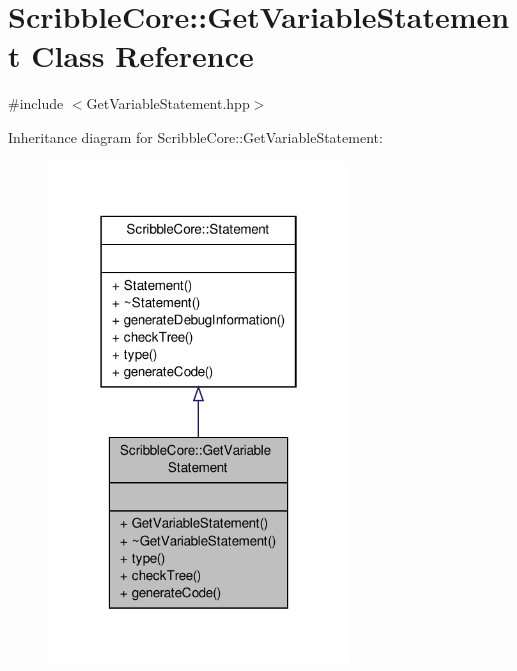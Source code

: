 \hypertarget{class_scribble_core_1_1_get_variable_statement}{\section{Scribble\-Core\-:\-:Get\-Variable\-Statement Class Reference}
\label{class_scribble_core_1_1_get_variable_statement}
}


{\ttfamily \#include $<$Get\-Variable\-Statement.\-hpp$>$}



Inheritance diagram for Scribble\-Core\-:\-:Get\-Variable\-Statement\-:
\nopagebreak
\begin{figure}[H]
\begin{center}
\leavevmode
\includegraphics[width=226pt]{class_scribble_core_1_1_get_variable_statement__inherit__graph}
\end{center}
\end{figure}


